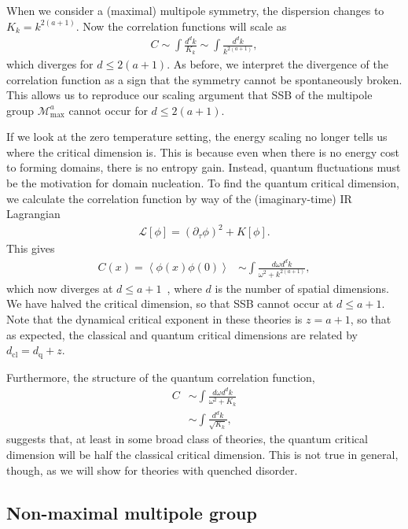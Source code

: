 \documentclass[pra,aps,twocolumn, amsfonts,amsmath,amssymb,nofootinbib,superscriptaddress]{revtex4-2}
\newcommand{\nn}{\nonumber\\}
\renewcommand{\max}{\text{max}}
\providecommand{\DIFaddbegin}{} %
\providecommand{\DIFaddend}{} %
\newcommand{\DIFaddincludegraphics}[2][]{{\color{blue}\fbox{\DIFOincludegraphics[#1]{#2}}}} %
\DeclareRobustCommand{\DIFaddbegin}{\DIFOaddbegin \let\includegraphics\DIFaddincludegraphics} %
\DeclareRobustCommand{\DIFaddend}{\DIFOaddend \let\includegraphics\DIFOincludegraphics} %
\begin{document}
When we consider a (maximal) multipole symmetry, the dispersion changes to $K_k=k^{2(a+1)}$. Now the correlation functions will scale as 
\begin{align}
C \sim \int \frac{d^dk}{K_k} \sim \int \frac{d^dk}{k^{2(a+1)}}, \label{eqn:correl}
\end{align}
which diverges for $d\le2(a+1)$. As before, we interpret the divergence of the correlation function as a sign that the symmetry cannot be spontaneously broken. This allows us to reproduce our scaling argument that SSB of the multipole group $\mathcal{M}^a_\max$ cannot occur for $d\le2(a+1)$.

If we look at the zero temperature setting, the energy scaling no longer tells us where the critical dimension is. This is because even when there is no energy cost to forming domains, there is no entropy gain. Instead, quantum fluctuations must be the motivation for domain nucleation. To find the quantum critical dimension, we calculate the correlation function by way of the (imaginary-time) IR Lagrangian 
\begin{align}
     \mathcal{L}[\phi] = (\partial_\tau\phi)^2 + K[\phi].
\end{align} 
This gives 
\begin{align}
\DIFaddbegin \label{tzerocorr}\DIFaddend C(x) = \left\langle \phi(x) \phi(0) \right\rangle &\sim \int \frac{d\omega d^dk}{\omega^2 + k^{2( a + 1 )}},
\end{align}
which now diverges at $d\le a+1$~\cite{Griffin2015}, where $d$ is the number of spatial dimensions. We have halved the critical dimension, so that SSB cannot occur at $d\le a+1$. Note that the dynamical critical exponent in these theories is $z = a+1$, so that as expected, the classical and quantum critical dimensions are related by $d_\text{cl} = d_\text{q} + z$.

Furthermore, the structure of the quantum correlation function,
\begin{align}
C &\sim \int \frac{d\omega d^dk}{\omega^2 + K_k}\nn
&\sim \int \frac{d^dk}{\sqrt{K_k}},
\end{align}
suggests that, at least in some broad class of theories, the quantum critical dimension will be half the classical critical dimension. This is not true in general, though, as we will show for theories with quenched disorder.

\subsection{Non-maximal multipole group} \label{sub:nonmax}
\end{document}
